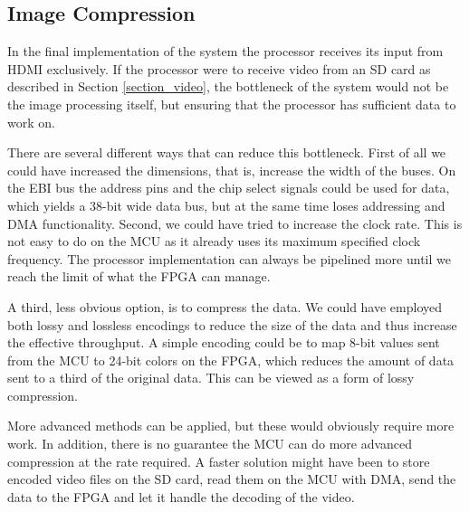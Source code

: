 \subsection{Image Compression}

In the final implementation of the system the processor receives its input from HDMI exclusively.
If the processor were to receive video from an SD card as described in Section \ref{section_video}, the bottleneck of the system would not be the image processing itself, but ensuring that the processor has sufficient data to work on.

There are several different ways that can reduce this bottleneck. First of all we could have increased the dimensions, that is, increase the width of the buses. On the EBI bus the address pins and the chip select signals could be used for data, which yields a 38-bit wide data bus, but at the same time loses addressing and DMA functionality. Second, we could have tried to increase the clock rate. This is not easy to do on the MCU as it already uses its maximum specified clock frequency. The processor implementation can always be pipelined more until we reach the limit of what the FPGA can manage.

A third, less obvious option, is to compress the data. We could have employed both lossy and lossless encodings to reduce the size of the data and thus increase the effective throughput. A simple encoding could be to map 8-bit values sent from the MCU to 24-bit colors on the FPGA, which reduces the amount of data sent to a third of the original data. This can be viewed as a form of lossy compression.

More advanced methods can be applied, but these would obviously require more work.
In addition, there is no guarantee the MCU can do more advanced compression at the rate required.
A faster solution might have been to store encoded video files on the SD card, read them on the MCU with DMA, send the data to the FPGA and let it handle the decoding of the video. 
